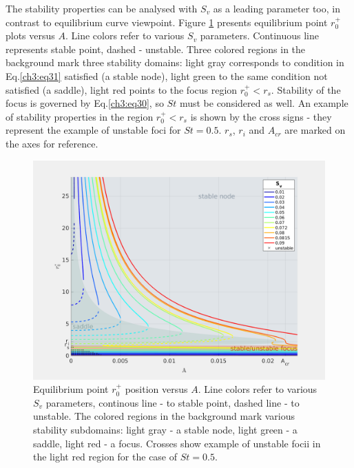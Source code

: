 \documentclass[../main.tex]{subfiles}
\begin{document}
The stability properties can be analysed with $S_v$ as a leading parameter too, in contrast to equilibrium curve viewpoint. Figure \ref{fig:ch3_8} presents equilibrium point $r^+_0$ plots versus $A$. Line colors refer to various $S_v$ parameters. Continuous line represents stable point, dashed - unstable. Three colored regions in the background mark three stability domains: light gray corresponds to condition in Eq.\ref{ch3:eq31} satisfied (a stable node), light green to the same condition not satisfied (a saddle), light red points to the focus region $r^+_0<r_s$. Stability of the focus is governed by Eq.\ref{ch3:eq30}, so $St$ must be considered as well. An example of stability properties in the region $r^+_0<r_s$ is shown by the cross signs - they represent the example of unstable foci for $St=0.5$. $r_s$, $r_i$ and $A_{cr}$ are marked on the axes for reference.

\begin{figure}
\centering
\noindent \includegraphics[width=30pc]{gfx/r0_vs_A_plus_stability.png}
\caption{Equilibrium point $r^+_0$ position versus $A$. Line colors refer to various $S_v$ parameters, continous line - to stable point, dashed line - to unstable. The colored regions in the background mark various stability subdomains: light gray - a stable node, light green - a saddle, light red - a focus. Crosses show example of unstable focii in the light red region for the case of $St=0.5$.}
\label{fig:ch3_8}
\end{figure}
\end{document}
